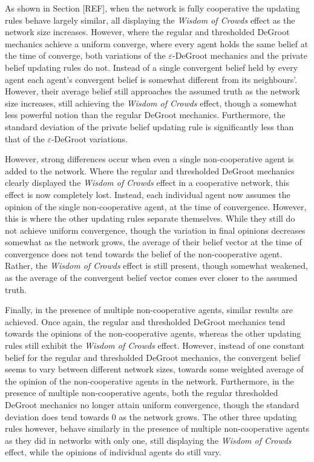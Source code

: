 \documentclass{article}
\begin{document}
\noindent As shown in Section [REF], when the network is fully cooperative the updating rules behave largely similar, all displaying the \emph{Wisdom of Crowds} effect as the network size increases. However, where the regular and thresholded DeGroot mechanics achieve a uniform converge, where every agent holds the same belief at the time of converge, both variations of the $\varepsilon$-DeGroot mechanics and the private belief updating rules do not. Instead of a single convergent belief held by every agent each agent's convergent belief is somewhat different from its neighbours'. However, their average belief still approaches the assumed truth as the network size increases, still achieving the \emph{Wisdom of Crowds} effect, though a somewhat less powerful notion than the regular DeGroot mechanics. Furthermore, the standard deviation of the private belief updating rule is significantly less than that of the $\varepsilon$-DeGroot variations.

\noindent However, strong differences occur when even a single non-cooperative agent is added to the network. Where the regular and thresholded DeGroot mechanics clearly displayed the \emph{Wisdom of Crowds} effect in a cooperative network, this effect is now completely lost. Instead, each individual agent now assumes the opinion of the single non-cooperative agent, at the time of convergence. However, this is where the other updating rules separate themselves. While they still do not achieve uniform convergence, though the variation in final opinions decreases somewhat as the network grows, the average of their belief vector at the time of convergence does not tend towards the belief of the non-cooperative agent. Rather, the \emph{Wisdom of Crowds} effect is still present, though somewhat weakened, as the average of the convergent belief vector comes ever closer to the assumed truth.

\noindent Finally, in the presence of multiple non-cooperative agents, similar results are achieved. Once again, the regular and thresholded DeGroot mechanics tend towards the opinions of the non-cooperative agents, whereas the other updating rules still exhibit the \emph{Wisdom of Crowds} effect. However, instead of one constant belief for the regular and thresholded DeGroot mechanics, the convergent belief seems to vary between different network sizes, towards some weighted average of the opinion of the non-cooperative agents in the network. Furthermore, in the presence of multiple non-cooperative agents, both the regular thresholded DeGroot mechanics no longer attain uniform convergence, though the standard deviation does tend towards $0$ as the network grows. The other three updating rules however, behave similarly in the presence of multiple non-cooperative agents as they did in networks with only one, still displaying the \emph{Wisdom of Crowds} effect, while the opinions of individual agents do still vary.
\end{document}
